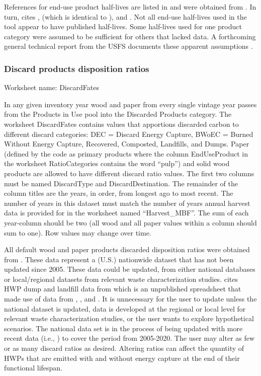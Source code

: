 \documentclass[
  openany]{book}
\begin{document}
References for end-use product half-lives are listed in and were obtained from \textcite{smith2006}. In turn, \textcite{smith2006} cites \textcite{skog1998}, \textcite{skog2000} (which is identical to \textcite{skog1998}), and \textcite{row1996}. Not all end-use half-lives used in the tool appear to have published half-lives. Some half-lives used for one product category were assumed to be sufficient for others that lacked data. A forthcoming general technical report from the USFS documents these apparent assumptions \autocite{lucey202X}.

\hypertarget{own-prov-input-discFates}{%
\subsubsection{Discard products disposition ratios}\label{own-prov-input-discFates}}

Worksheet name: DiscardFates

In any given inventory year wood and paper from every single vintage year passes from the Products in Use pool into the Discarded Products category. The worksheet DiscardFates contains values that apportions discarded carbon to different discard categories: DEC = Discard Energy Capture, BWoEC = Burned Without Energy Capture, Recovered, Composted, Landfills, and Dumps. Paper (defined by the code as primary products where the column EndUseProduct in the worksheet RatioCategories contains the word ``pulp'') and solid wood products are allowed to have different discard ratio values. The first two columns must be named DiscardType and DiscardDestination. The remainder of the column titles are the years, in order, from longest ago to most recent. The number of years in this dataset must match the number of years annual harvest data is provided for in the worksheet named ``Harvest\_MBF''. The sum of each year-column should be two (all wood and all paper values within a column should sum to one). Row values may change over time.

All default wood and paper products discarded disposition ratios were obtained from \textcite{skog2008}. These data represent a (U.S.) nationwide dataset that has not been updated since 2005. These data could be updated, from either national databases or local/regional datasets from relevant waste characterization studies. \textcite{skog2008} cites HWP dump and landfill data from \textcite{freed2004} which is an unpublished spreadsheet that made use of data from \textcite{epa2006}, \textcite{melosi1982}, and \textcite{melosi1999}. It is unnecessary for the user to update unless the national dataset is updated, data is developed at the regional or local level for relevant waste characterization studies, or the user wants to explore hypothetical scenarios. The national data set is in the process of being updated with more recent data (i.e., \textcite{usepa2020}) to cover the period from 2005-2020. The user may alter as few or as many discard ratios as desired. Altering ratios can affect the quantity of HWPs that are emitted with and without energy capture at the end of their functional lifespan.
\end{document}
